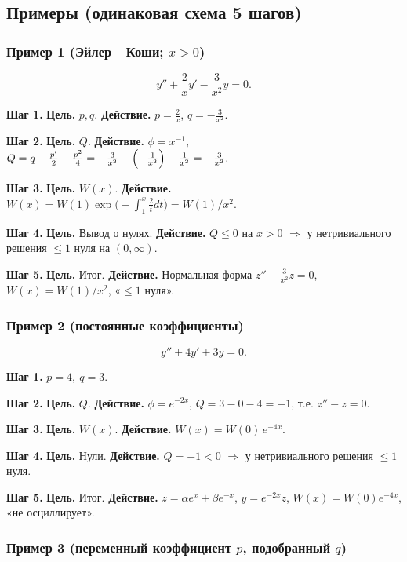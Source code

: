 \subsection{Примеры (одинаковая схема 5 шагов)}\label{sec:ode2-examples}

\subsubsection{Пример 1 (Эйлер—Коши; $x>0$)}

\[
y''+\frac{2}{x}y' - \frac{3}{x^2}y=0.
\]

\textbf{Шаг 1.} \textbf{Цель.} $p,q$. \textbf{Действие.} $p=\frac{2}{x}$, $q=-\frac{3}{x^2}$.

\textbf{Шаг 2.} \textbf{Цель.} $Q$. \textbf{Действие.} $\phi=x^{-1}$,
$
Q=q-\frac{p'}{2}-\frac{p^2}{4}
=-\frac{3}{x^2}-\Bigl(-\frac{1}{x^2}\Bigr)-\frac{1}{x^2}=-\frac{3}{x^2}.
$

\textbf{Шаг 3.} \textbf{Цель.} $W(x)$. \textbf{Действие.} $W(x)=W(1)\exp\!\bigl(-\int_1^x\frac{2}{t}dt\bigr)=W(1)/x^2$.

\textbf{Шаг 4.} \textbf{Цель.} Вывод о нулях. \textbf{Действие.} $Q\le0$ на $x>0$ $\Rightarrow$ у нетривиального решения $\le1$ нуля на $(0,\infty)$.

\textbf{Шаг 5.} \textbf{Цель.} Итог. \textbf{Действие.} Нормальная форма $z''-\frac{3}{x^2}z=0$, $W(x)=W(1)/x^2$, «$\le1$ нуля».

\subsubsection{Пример 2 (постоянные коэффициенты)}

\[
y''+4y'+3y=0.
\]

\textbf{Шаг 1.} $p=4,\ q=3$.

\textbf{Шаг 2.} \textbf{Цель.} $Q$. \textbf{Действие.} $\phi=e^{-2x}$, $Q=3-0-4=-1$, т.е. $z''-z=0$.

\textbf{Шаг 3.} \textbf{Цель.} $W(x)$. \textbf{Действие.} $W(x)=W(0)\,e^{-4x}$.

\textbf{Шаг 4.} \textbf{Цель.} Нули. \textbf{Действие.} $Q=-1<0$ $\Rightarrow$ у нетривиального решения $\le1$ нуля.

\textbf{Шаг 5.} \textbf{Цель.} Итог. \textbf{Действие.} $z=\alpha e^x+\beta e^{-x}$, $y=e^{-2x}z$, $W(x)=W(0)e^{-4x}$, «не осциллирует».

\subsubsection{Пример 3 (переменный коэффициент $p$, подобранный $q$)}

